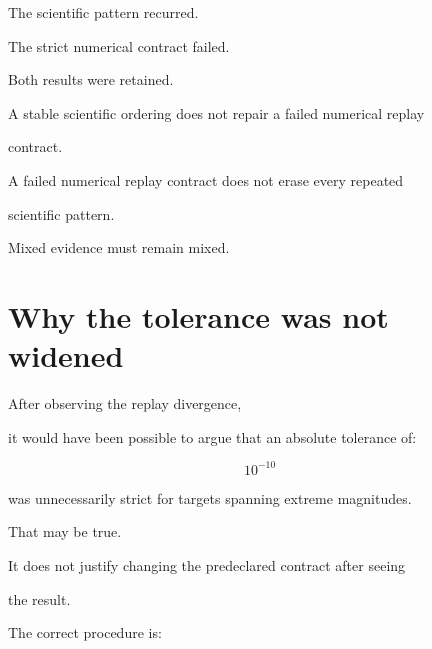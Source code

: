 \documentclass[11pt,a4paper,oneside]{report}
\begin{document}
The scientific pattern recurred.



The strict numerical contract failed.



Both results were retained.





\begin{governingrule}



A stable scientific ordering does not repair a failed numerical replay

contract.



A failed numerical replay contract does not erase every repeated

scientific pattern.



Mixed evidence must remain mixed.



\end{governingrule}





\section{Why the tolerance was not widened}



After observing the replay divergence,

it would have been possible to argue that an absolute tolerance of:



\begin{equation}
10^{-10}
\end{equation}



was unnecessarily strict for targets spanning extreme magnitudes.



That may be true.



It does not justify changing the predeclared contract after seeing

the result.



The correct procedure is:
\end{document}

